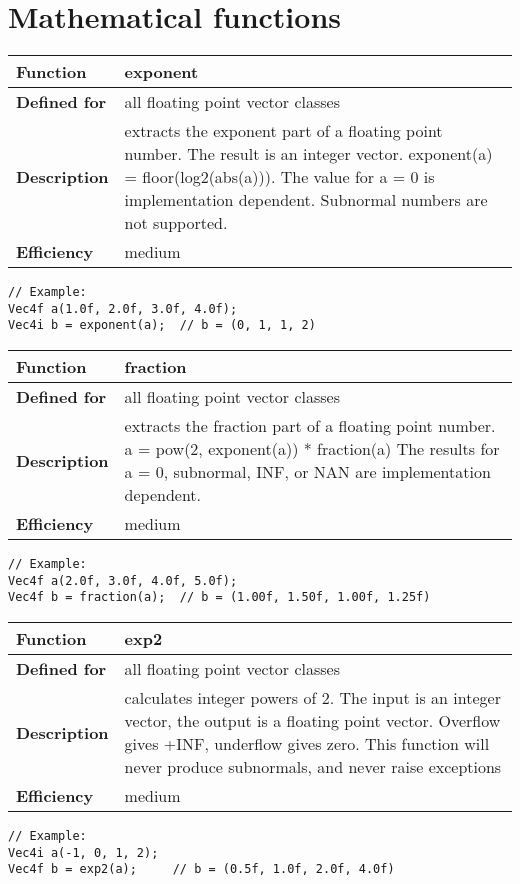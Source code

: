 \documentclass[vcl_manual.tex]{subfiles}
\begin{document}
\chapter{Mathematical functions}\label{chap:MathematicalFunctions}
\flushleft

\begin{tabular}{|p{25mm}|p{100mm}|}
\hline
\bfseries Function & exponent \\ \hline
\bfseries Defined for & all floating point vector classes \\ \hline
\bfseries Description & extracts the exponent part of a floating point number. The result is an integer vector.\newline 
exponent(a) = floor(log2(abs(a))).\newline
The value for a = 0 is implementation dependent.\newline 
Subnormal numbers are not supported. \\ \hline
 \bfseries Efficiency & medium \\ \hline
\end{tabular}
\begin{lstlisting}[frame=none]
// Example:
Vec4f a(1.0f, 2.0f, 3.0f, 4.0f);
Vec4i b = exponent(a);  // b = (0, 1, 1, 2)
\end{lstlisting}


\begin{tabular}{|p{25mm}|p{100mm}|}
\hline
\bfseries Function & fraction \\ \hline
\bfseries Defined for & all floating point vector classes \\ \hline
\bfseries Description & extracts the fraction part of a floating point number.\newline
a = pow(2, exponent(a)) * fraction(a) \newline
The results for a = 0, subnormal, INF, or NAN are implementation dependent. \\ \hline
\bfseries Efficiency & medium \\ \hline
\end{tabular}
\begin{lstlisting}[frame=none]
// Example:
Vec4f a(2.0f, 3.0f, 4.0f, 5.0f);
Vec4f b = fraction(a);  // b = (1.00f, 1.50f, 1.00f, 1.25f)
\end{lstlisting}


\begin{tabular}{|p{25mm}|p{100mm}|}
\hline
\bfseries Function & exp2 \\ \hline
\bfseries Defined for & all floating point vector classes \\ \hline
\bfseries Description & calculates integer powers of 2. The input is an integer vector, the output is a floating point vector. Overflow gives +INF, underflow gives zero. This function will never produce subnormals, and never raise exceptions \\ \hline
\bfseries Efficiency & medium \\ \hline
\end{tabular}
\begin{lstlisting}[frame=none]
// Example:
Vec4i a(-1, 0, 1, 2);
Vec4f b = exp2(a);     // b = (0.5f, 1.0f, 2.0f, 4.0f)
\end{lstlisting}
\end{document}

